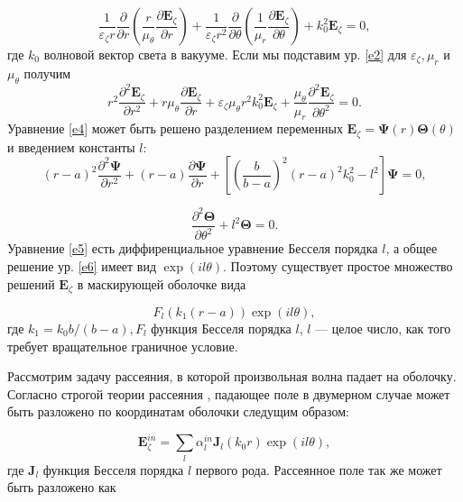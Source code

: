 \documentclass[a4paper, 12pt]{article}
\begin{document}
\begin{equation}\label{e3}
	\frac{1}{\varepsilon_\zeta r} \frac{\partial}{\partial r}(\frac{r}{\mu_\theta}\frac{\partial \textbf{E}_\zeta}
	{\partial r}) +
	\frac{1}{\varepsilon_\zeta r^2} \frac{\partial}{\partial \theta}(\frac{1}{\mu_r}\frac{\partial \textbf{E}_\zeta}
	{\partial \theta}) + k_0^2 \textbf{E}_\zeta = 0,
\end{equation}
где $k_0$ волновой вектор света в вакууме. Если мы подставим ур. \eqref{e2} для $\varepsilon_\zeta, \mu_r$ и 
$\mu_\theta$ получим
\begin{equation}\label{e4}
	r^2 \frac{\partial^2 \textbf{E}_\zeta}{\partial r^2} + r\mu_\theta \frac{\partial \textbf{E}_\zeta}{\partial r} + 
	\varepsilon_\zeta \mu_\theta r^2 k_0^2 \textbf{E}_\zeta + \frac{\mu_\theta}{\mu_r} \frac{\partial^2 
	\textbf{E}_\zeta}{\partial \theta^2} = 0.
\end{equation}
Уравнение \eqref{e4} может быть решено разделением переменных
$ \textbf{E}_\zeta = \mathbf{\Psi}(r) \mathbf{\Theta}(\theta)$ и введением константы $l$:
\begin{equation}\label{e5}
	(r-a)^2 \frac{\partial^2 \mathbf{\Psi}}{\partial r^2} + (r-a) \frac{\partial \mathbf{\Psi}}{\partial r} +
	\left[ (\frac{b}{b-a})^2(r-a)^2 k_0^2-l^2\right] \mathbf{\Psi} = 0,
\end{equation}

\begin{equation}\label{e6}
	\frac{\partial^2 \mathbf{\Theta}}{\partial \theta^2} + l^2 \mathbf{\Theta} = 0.
\end{equation}
Уравнение \eqref{e5} есть диффиренциальное уравнение Бесселя порядка $l$, а общее решение ур. \eqref{e6} имеет вид
$\exp(il\theta)$. Поэтому существует простое множество решений $\mathbf{E}_\zeta$ в маскирующей оболочке вида

\begin{equation}\label{e7}
	F_l(k_1(r-a))\exp(il\theta),
\end{equation}
где $k_1 = k_0 b/(b-a), F_l$ функция Бесселя порядка $l$, $l$ --- целое число, как того требует вращательное граничное 
условие.

Рассмотрим задачу рассеяния, в которой произвольная волна падает на оболочку. Согласно строгой теории рассеяния 
\cite{12}, падающее поле в двумерном случае может быть разложено по координатам оболочки следущим образом:

\begin{equation}\label{e8}
	\mathbf{E}_\zeta^{in} = \sum\limits_l \alpha_l^{in} \mathbf{J}_l(k_0 r)\exp(il\theta),
\end{equation}
где $\mathbf{J}_l$ функция Бесселя порядка $l$ первого рода. Рассеянное поле так же может быть разложено как
\end{document}
